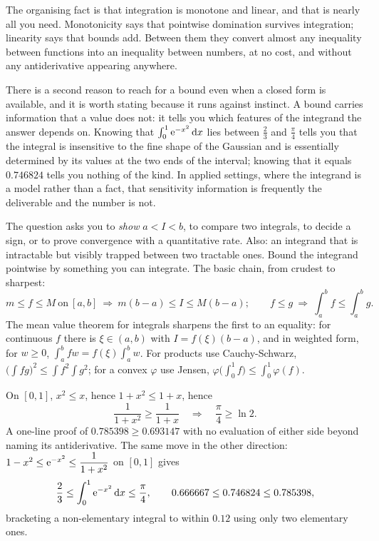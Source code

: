 The organising fact is that integration is monotone and linear, and that is nearly all you need. Monotonicity says that pointwise domination survives integration; linearity says that bounds add. Between them they convert almost any inequality between functions into an inequality between numbers, at no cost, and without any antiderivative appearing anywhere.

There is a second reason to reach for a bound even when a closed form is available, and it is worth stating because it runs against instinct. A bound carries information that a value does not: it tells you which features of the integrand the answer depends on. Knowing that $\int_0^{1}\mathrm{e}^{-x^{2}}\,\mathrm{d} x$ lies between $\tfrac23$ and $\tfrac{\pi}{4}$ tells you that the integral is insensitive to the fine shape of the Gaussian and is essentially determined by its values at the two ends of the interval; knowing that it equals $0.746824$ tells you nothing of the kind. In applied settings, where the integrand is a model rather than a fact, that sensitivity information is frequently the deliverable and the number is not.

\cue The question asks you to \emph{show} $a<I<b$, to compare two integrals, to decide a sign, or to prove convergence with a quantitative rate. Also: an integrand that is intractable but visibly trapped between two tractable ones.
\method Bound the integrand pointwise by something you can integrate. The basic chain, from crudest to sharpest:
\[m\leq f\leq M\ \text{on}\ [a,b]\ \Longrightarrow\ m(b-a)\leq I\leq M(b-a);\qquad f\leq g\ \Longrightarrow\ \int_a^bf\leq\int_a^bg.\]
The mean value theorem for integrals sharpens the first to an equality: for continuous $f$ there is $\xi\in(a,b)$ with $I=f(\xi)(b-a)$, and in weighted form, for $w\geq0$, $\int_a^bf w=f(\xi)\int_a^bw$. For products use Cauchy-Schwarz, $\bigl(\int fg\bigr)^{2}\leq\int f^{2}\int g^{2}$; for a convex $\varphi$ use Jensen, $\varphi\bigl(\int_0^{1}f\bigr)\leq\int_0^{1}\varphi(f)$.

\begin{worked}
On $[0,1]$, $x^{2}\leq x$, hence $1+x^{2}\leq1+x$, hence
\[\frac{1}{1+x^{2}}\geq\frac{1}{1+x}\quad\Longrightarrow\quad\frac{\pi}{4}\geq\ln2.\]
A one-line proof of $0.785398\geq0.693147$ with no evaluation of either side beyond naming its antiderivative. The same move in the other direction: $1-x^{2}\leq\mathrm{e}^{-x^{2}}\leq\dfrac{1}{1+x^{2}}$ on $[0,1]$ gives
\[\frac23\leq\int_0^{1}\mathrm{e}^{-x^{2}}\,\mathrm{d} x\leq\frac{\pi}{4},\qquad 0.666667\leq0.746824\leq0.785398,\]
bracketing a non-elementary integral to within $0.12$ using only two elementary ones.
\end{worked}


